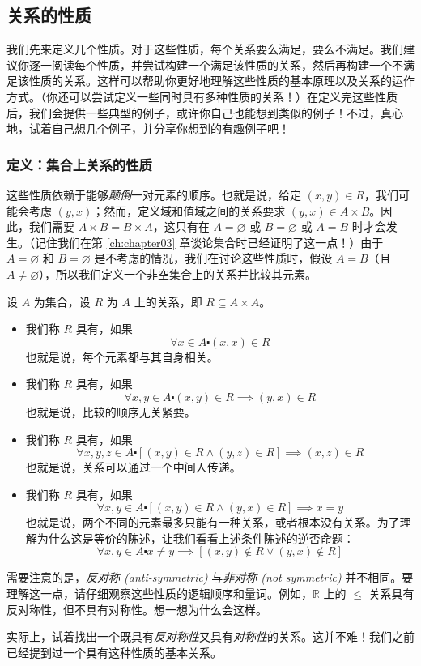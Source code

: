 
\subsection{关系的性质}

我们先来定义几个性质。对于这些性质，每个关系要么满足，要么不满足。我们建议你逐一阅读每个性质，并尝试构建一个满足该性质的关系，然后再构建一个不满足该性质的关系。这样可以帮助你更好地理解这些性质的基本原理以及关系的运作方式。（你还可以尝试定义一些同时具有多种性质的关系！）在定义完这些性质后，我们会提供一些典型的例子，或许你自己也能想到类似的例子！不过，真心地，试着自己想几个例子，并分享你想到的有趣例子吧！

\subsubsection*{定义：集合上关系的性质}

这些性质依赖于能够\emph{颠倒}一对元素的顺序。也就是说，给定 $(x, y) \in R$，我们可能会考虑 $(y, x)$；然而，定义域和值域之间的关系要求 $(y, x) \in A \times B$。因此，我们需要 $A \times B = B \times A$，这只有在 $A = \varnothing$ 或 $B = \varnothing$ 或 $A = B$ 时才会发生。（记住我们在第 \ref{ch:chapter03} 章谈论集合时已经证明了这一点！）由于 $A = \varnothing$ 和 $B = \varnothing$ 是不考虑的情况，我们在讨论这些性质时，假设 $A = B$（且 $A \ne \varnothing$），所以我们定义一个非空集合上的关系并比较其元素。

\begin{definition}
    设 $A$ 为集合，设 $R$ 为 $A$ 上的关系，即 $R \subseteq A \times A$。
    \begin{itemize}
        \item 我们称 $R$ 具有，如果
            \[\forall x \in A \centerdot (x, x) \in R\]
            也就是说，每个元素都与其自身相关。
        \item 我们称 $R$ 具有，如果
            \[\forall x,y \in A \centerdot (x, y) \in R \implies (y,x) \in R\]
            也就是说，比较的顺序无关紧要。
        \item 我们称 $R$ 具有，如果
            \[\forall x, y, z \in A \centerdot [(x, y) \in R \land (y, z) \in R] \implies (x, z) \in R\]
            也就是说，关系可以通过一个中间人传递。
        \item 我们称 $R$ 具有，如果
            \[\forall x, y \in A \centerdot [(x, y) \in R \land (y, x) \in R] \implies x = y\]
            也就是说，两个不同的元素最多只能有一种关系，或者根本没有关系。为了理解为什么这是等价的陈述，让我们看看上述条件陈述的逆否命题：
            \[\forall x, y \in A \centerdot x \ne y \implies [(x, y) \notin R \lor (y, x) \notin R]\]
    \end{itemize}
\end{definition}

需要注意的是，\emph{反对称 (anti-symmetric)} 与\emph{非对称 (not symmetric)} 并不相同。要理解这一点，请仔细观察这些性质的逻辑顺序和量词。例如，$\mathbb{R}$ 上的 $\le$ 关系具有反对称性，但不具有对称性。想一想为什么会这样。

实际上，试着找出一个既具有\emph{反对称性}又具有\emph{对称性}的关系。这并不难！我们之前已经提到过一个具有这种性质的基本关系。

